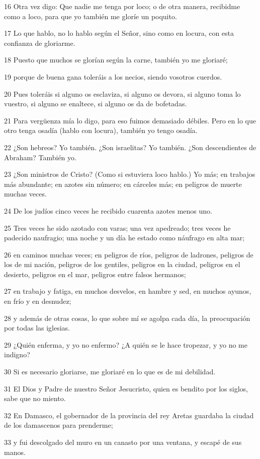 \par 16 Otra vez digo: Que nadie me tenga por loco; o de otra manera, recibidme como a loco, para que yo también me gloríe un poquito.
\par 17 Lo que hablo, no lo hablo según el Señor, sino como en locura, con esta confianza de gloriarme.
\par 18 Puesto que muchos se glorían según la carne, también yo me gloriaré;
\par 19 porque de buena gana toleráis a los necios, siendo vosotros cuerdos.
\par 20 Pues toleráis si alguno os esclaviza, si alguno os devora, si alguno toma lo vuestro, si alguno se enaltece, si alguno os da de bofetadas.
\par 21 Para vergüenza mía lo digo, para eso fuimos demasiado débiles. Pero en lo que otro tenga osadía (hablo con locura), también yo tengo osadía.
\par 22 ¿Son hebreos? Yo también. ¿Son israelitas? Yo también. ¿Son descendientes de Abraham? También yo.
\par 23 ¿Son ministros de Cristo? (Como si estuviera loco hablo.) Yo más; en trabajos más abundante; en azotes sin número; en cárceles más; en peligros de muerte muchas veces.
\par 24 De los judíos cinco veces he recibido cuarenta azotes menos uno.
\par 25 Tres veces he sido azotado con varas; una vez apedreado; tres veces he padecido naufragio; una noche y un día he estado como náufrago en alta mar;
\par 26 en caminos muchas veces; en peligros de ríos, peligros de ladrones, peligros de los de mi nación, peligros de los gentiles, peligros en la ciudad, peligros en el desierto, peligros en el mar, peligros entre falsos hermanos;
\par 27 en trabajo y fatiga, en muchos desvelos, en hambre y sed, en muchos ayunos, en frío y en desnudez;
\par 28 y además de otras cosas, lo que sobre mí se agolpa cada día, la preocupación por todas las iglesias.
\par 29 ¿Quién enferma, y yo no enfermo? ¿A quién se le hace tropezar, y yo no me indigno?
\par 30 Si es necesario gloriarse, me gloriaré en lo que es de mi debilidad.
\par 31 El Dios y Padre de nuestro Señor Jesucristo, quien es bendito por los siglos, sabe que no miento.
\par 32 En Damasco, el gobernador de la provincia del rey Aretas guardaba la ciudad de los damascenos para prenderme;
\par 33 y fui descolgado del muro en un canasto por una ventana, y escapé de sus manos.


